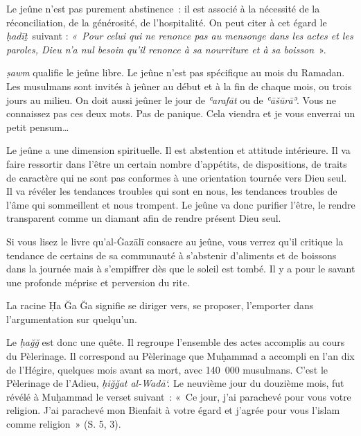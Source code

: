 Le jeûne n'est pas purement abstinence~: il est associé à la nécessité
de la réconciliation, de la générosité, de l'hospitalité. On peut citer
à cet égard le \emph{ḥadīṯ}~suivant : \emph{«~Pour celui qui ne renonce
pas au mensonge dans les actes et les paroles, Dieu n'a nul besoin qu'il
renonce à sa nourriture et à sa boisson}~».

\emph{ṣawm} qualifie le jeûne libre. Le jeûne n'est pas spécifique au
mois du Ramadan. Les musulmans sont invités à jeûner au début et à la
fin de chaque mois, ou trois jours au milieu. On doit aussi jeûner le
jour de \emph{ʿarafāt} ou de \emph{ʿāšūrāʾ}. Vous ne connaissez pas ces
deux mots. Pas de panique. Cela viendra et je vous enverrai un petit
pensum\ldots{}

Le jeûne a une dimension spirituelle. Il est abstention et attitude
intérieure. Il va faire ressortir dans l'être un certain nombre
d'appétits, de dispositions, de traits de caractère qui ne sont pas
conformes à une orientation tournée vers Dieu seul. Il va révéler les
tendances troubles qui sont en nous, les tendances troubles de l'âme qui
sommeillent et nous trompent. Le jeûne va donc purifier l'être, le
rendre transparent comme un diamant afin de rendre présent Dieu seul.

Si vous lisez le livre qu'al-Ġazālī \label{theol:AlGazali16} consacre au jeûne, vous verrez qu'il
critique la tendance de certains de sa communauté à s'abstenir
d'aliments et de boissons dans la journée mais à s'empiffrer dès que le
soleil est tombé. Il y a pour le savant une profonde méprise et
perversion du rite.




La racine Ḥa Ğa Ğa signifie se diriger vers, se proposer, l'emporter
dans l'argumentation sur quelqu'un.

Le \emph{ḥağğ} est donc une quête. Il regroupe l'ensemble des actes
accomplis au cours du Pèlerinage. Il correspond au Pèlerinage que
Muḥammad a accompli en l'an dix de l'Hégire, quelques mois avant sa
mort, avec 140~000 musulmans. C'est le Pèlerinage de l'Adieu,
\emph{ḥiğğat al-Wadā`.} Le neuvième jour du douzième mois, fut révélé à
Muḥammad le verset suivant~: «~Ce jour, j'ai parachevé pour vous votre
religion. J'ai parachevé mon Bienfait à votre égard et j'agrée pour vous
l'islam comme religion~» (S. 5, 3).

